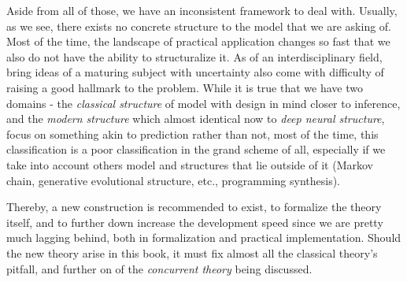 Aside from all of those, we have an inconsistent framework to deal with. Usually, as we see, there exists no concrete structure to the model that we are asking of. Most of the time, the landscape of practical application changes so fast that we also do not have the ability to structuralize it. As of an interdisciplinary field, bring ideas of a maturing subject with uncertainty also come with difficulty of raising a good hallmark to the problem. While it is true that we have two domains - the \textit{classical structure} of model with design in mind closer to inference, and the \textit{modern structure} which almost identical now to \textit{deep neural structure}, focus on something akin to prediction rather than not, most of the time, this classification is a poor classification in the grand scheme of all, especially if we take into account others model and structures that lie outside of it (Markov chain, generative evolutional structure, etc., programming synthesis). 

Thereby, a new construction is recommended to exist, to formalize the theory itself, and to further down increase the development speed since we are pretty much lagging behind, both in formalization and practical implementation. Should the new theory arise in this book, it must fix almost all the classical theory's pitfall, and further on of the \textit{concurrent theory} being discussed. 

